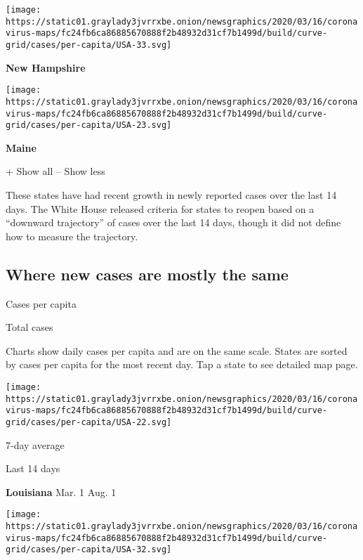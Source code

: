 \texttt{[image: https://static01.graylady3jvrrxbe.onion/newsgraphics/2020/03/16/coronavirus-maps/fc24fb6ca86885670888f2b48932d31cf7b1499d/build/curve-grid/cases/per-capita/USA-33.svg]}

\textbf{New Hampshire}

\href{https://www.nytimes3xbfgragh.onion/interactive/2020/us/maine-coronavirus-cases.html}{}

\texttt{[image: https://static01.graylady3jvrrxbe.onion/newsgraphics/2020/03/16/coronavirus-maps/fc24fb6ca86885670888f2b48932d31cf7b1499d/build/curve-grid/cases/per-capita/USA-23.svg]}

\textbf{Maine}

+ Show all -- Show less

These states have had recent growth in newly reported cases over the
last 14 days. The White House released criteria for states to reopen
based on a ``downward trajectory'' of cases over the last 14 days,
though it did not define how to measure the trajectory.

\hypertarget{where-new-cases-are-mostly-the-same}{%
\subsection{Where new cases are mostly the
same}\label{where-new-cases-are-mostly-the-same}}

Cases per capita

Total cases

Charts show daily cases per capita and are on the same scale. States are
sorted by cases per capita for the most recent day. Tap a state to see
detailed map page.

\href{https://www.nytimes3xbfgragh.onion/interactive/2020/us/louisiana-coronavirus-cases.html}{}

\texttt{[image: https://static01.graylady3jvrrxbe.onion/newsgraphics/2020/03/16/coronavirus-maps/fc24fb6ca86885670888f2b48932d31cf7b1499d/build/curve-grid/cases/per-capita/USA-22.svg]}

7-day average

Last 14 days

\textbf{Louisiana} Mar. 1 Aug. 1

\href{https://www.nytimes3xbfgragh.onion/interactive/2020/us/nevada-coronavirus-cases.html}{}

\texttt{[image: https://static01.graylady3jvrrxbe.onion/newsgraphics/2020/03/16/coronavirus-maps/fc24fb6ca86885670888f2b48932d31cf7b1499d/build/curve-grid/cases/per-capita/USA-32.svg]}

